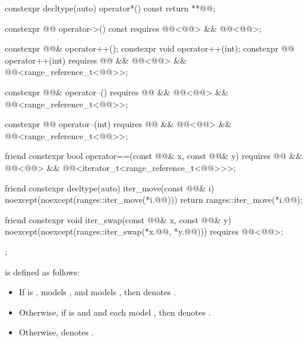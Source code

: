 \begin{codeblock}
{{    constexpr decltype(auto) operator*() const { return **@@; }

    constexpr @@ operator->() const
      requires @@<@@> && @@<@@>;

    constexpr @@& operator++();
    constexpr void operator++(int);
    constexpr @@ operator++(int)
      requires @@ && @@<@@> &&
               @@<range_reference_t<@@>>;

    constexpr @@& operator--()
      requires @@ && @@<@@> &&
               @@<range_reference_t<@@>>;

    constexpr @@ operator--(int)
      requires @@ && @@<@@> &&
               @@<range_reference_t<@@>>;

    friend constexpr bool operator==(const @@& x, const @@& y)
      requires @@ && @@<@@> &&
               @@<iterator_t<range_reference_t<@@>>>;

    friend constexpr decltype(auto) iter_move(const @@& i)
    noexcept(noexcept(ranges::iter_move(*i.@@))) {
      return ranges::iter_move(*i.@@);
    }

    friend constexpr void iter_swap(const @@& x, const @@& y)
      noexcept(noexcept(ranges::iter_swap(*x.@@, *y.@@)))
      requires @@<@@>;
  };
}
\end{codeblock}

\pnum
{} is defined as follows:
\begin{itemize}
\item If  is ,
   models , and
   models ,
  then  denotes .
\item Otherwise, if  is  and
   and 
  each model , then  denotes
  .
\item Otherwise,  denotes .
\end{itemize}

